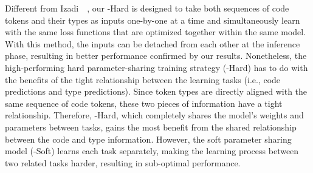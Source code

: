 Different from Izadi~\ea~\cite{izadi2022codefill}, our \our-Hard is designed to take both sequences of code tokens and their types as inputs one-by-one at a time and simultaneously learn with the same loss functions that are optimized together within the same model.
With this method, the inputs can be detached from each other at the inference phase, resulting in better performance confirmed by our results.
Nonetheless, the high-performing hard parameter-sharing training strategy (\our-Hard) has to do with the benefits of the tight relationship between the learning tasks (i.e., code predictions and type predictions).
Since token types are directly aligned with the same sequence of code tokens, these two pieces of information have a tight relationship.
Therefore, \our-Hard, which completely shares the model’s weights and parameters between tasks, gains the most benefit from the shared relationship between the code and type information.
However, the soft parameter sharing model (\our-Soft) learns each task separately, making the learning process between two related tasks harder, resulting in sub-optimal performance.



